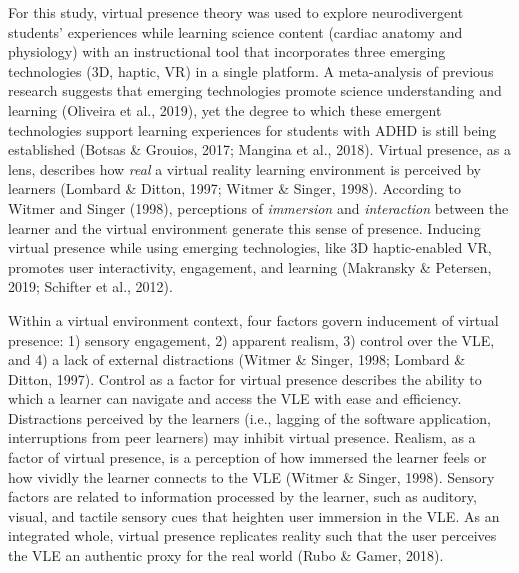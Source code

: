 \documentclass[11.5pt]{sig-alternate} %
\begin{document}
\begin{large}
For this study, virtual presence theory was used to explore neurodivergent students’ experiences while learning science content (cardiac anatomy and physiology) with an instructional tool that incorporates three emerging technologies (3D, haptic, VR) in a single platform. A meta-analysis of previous research suggests that emerging technologies promote science understanding and learning (Oliveira et al., 2019), yet the degree to which these emergent technologies support learning experiences for students with ADHD is still being established (Botsas \& Grouios, 2017; Mangina et al., 2018). Virtual presence, as a lens, describes how \textit{real} a virtual reality learning environment is perceived by learners (Lombard \& Ditton, 1997; Witmer \& Singer, 1998). According to Witmer and Singer (1998), perceptions of \textit{immersion} and \textit{interaction} between the learner and the virtual environment generate this sense of presence. Inducing virtual presence while using emerging technologies, like 3D haptic-enabled VR, promotes user interactivity, engagement, and learning (Makransky \& Petersen, 2019; Schifter et al., 2012).

Within a virtual environment context, four factors govern inducement of virtual presence: 1) sensory engagement, 2) apparent realism, 3) control over the VLE, and 4) a lack of external distractions (Witmer \& Singer, 1998; Lombard \& Ditton, 1997). Control as a factor for virtual presence describes the ability to which a learner can navigate and access the VLE with ease and efficiency. Distractions perceived by the learners (i.e., lagging of the software application, interruptions from peer learners) may inhibit virtual presence. Realism, as a factor of virtual presence, is a perception of how immersed the learner feels or how vividly the learner connects to the VLE (Witmer \& Singer, 1998). Sensory factors are related to information processed by the learner, such as auditory, visual, and tactile sensory cues that heighten user immersion in the VLE. As an integrated whole, virtual presence replicates reality such that the user perceives the VLE an authentic proxy for the real world (Rubo \& Gamer, 2018).


\end{large}
\end{document}
